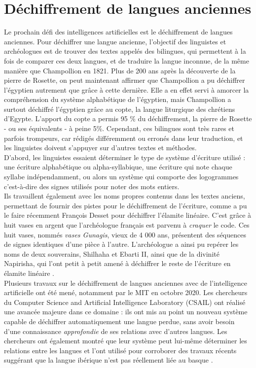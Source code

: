 \documentclass[12pt, french, twoside]{report}
\begin{document}
\section{Déchiffrement de langues anciennes}
Le prochain défi des intelligences artificielles est le déchiffrement de langues anciennes.  Pour déchiffrer une langue ancienne, l'objectif des linguistes et archéologues est de trouver des textes appelés des \og bilingues\fg, qui permettent à la fois de comparer ces deux langues, et de traduire la langue inconnue, de la même manière que Champollion en 1821. Plus de 200 ans après la découverte de la pierre de Rosette, on peut maintenant affirmer que Champollion a pu déchiffrer l'égyptien autrement que grâce à cette dernière.  Elle a en effet servi à amorcer la compréhension du système alphabétique de l'égyptien, mais Champollion a surtout déchiffré l'égyptien grâce au copte, la langue liturgique des chrétiens d'Egypte. L'apport du copte a permis 95 \% du déchiffrement, la pierre de Rosette - ou ses équivalents - à peine 5\%. Cependant, ces bilingues sont très rares et parfois trompeurs, car rédigés différemment ou erronés dans leur traduction, et les linguistes doivent s'appuyer sur d'autres textes et méthodes.\\
\indent D'abord, les linguistes essaient déterminer le type de système d'écriture utilisé : une écriture alphabétique ou alpha-syllabique, une écriture qui note chaque syllabe indépendamment, ou alors un système qui comporte des logogrammes c'est-à-dire des signes utilisés pour noter des mots entiers.\\ %
\indent Ils travaillent également avec les noms propres contenus dans les textes anciens, permettant de fournir des pistes pour le déchiffrement de l'écriture, comme a pu le faire récemment François Desset pour déchiffrer l'élamite linéaire. C'est grâce à huit vases en argent que l'archéologue français est parvenu à \textit{craquer} le code. Ces huit vases, nommés \textit{vases Gunagis}, vieux de 4 000 ans, présentent des séquences de signes identiques d'une pièce à l'autre. L'archéologue a ainsi pu repérer les noms de deux souverains, Shilhaha et Ebarti II, ainsi que de la divinité Napirisha, qui l'ont petit à petit amené à déchiffrer le reste de l'écriture en élamite linéaire \citep{linear-elamite-writing}.\\

Plusieurs travaux sur le déchiffrement de langues anciennes avec de l'intelligence artificielle ont été mené, notamment par le MIT en octobre 2020. Les chercheurs du Computer Science and Artificial Intelligence Laboratory (CSAIL) ont réalisé une avancée majeure dans ce domaine \citep{luo-et-al-2020} : ils ont mis au point un nouveau système capable de déchiffrer automatiquement une langue perdue, sans avoir besoin d'une connaissance \textit{approfondie} de ses relations avec d'autres langues. Les chercheurs ont également montré que leur système peut lui-même déterminer les relations entre les langues et l'ont utilisé pour corroborer des travaux récents suggérant que la langue ibérique n'est pas réellement liée au basque \citep{deepmind2022}.\\
\end{document}
